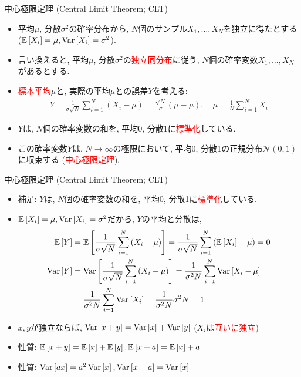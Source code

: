 \documentclass[dvipdfmx,notheorems,t]{beamer}
\begin{document}
\begin{frame}{中心極限定理 (Central Limit Theorem; CLT)}
\begin{itemize}
  \item 平均$\mu$, 分散$\sigma^2$の確率分布から, $N$個のサンプル$X_1, \ldots, X_N$を独立に得たとする
  ($\operatorname{\mathbb{E}} \left[ X_i \right] = \mu, \operatorname{Var} \left[ X_i \right] = \sigma^2$).
  \item 言い換えると, 平均$\mu$, 分散$\sigma^2$の\textcolor{red}{独立同分布}に従う,
  $N$個の確率変数$X_1, \ldots, X_N$があるとする.
  \item \textcolor{red}{標本平均}$\bar{\mu}$と, 実際の平均$\mu$との誤差$Y$を考える:
  \begin{align*}
    Y = \frac{1}{\sigma \sqrt{N}} \sum_{i = 1}^N \left( X_i - \mu \right)
      = \frac{\sqrt{N}}{\sigma} \left( \bar{\mu} - \mu \right), \quad
    \bar{\mu} = \frac{1}{N} \sum_{i = 1}^N X_i
  \end{align*}
  \item $Y$は, $N$個の確率変数の和を, 平均0, 分散1に\textcolor{red}{標準化}している.
  \item この確率変数$Y$は, $N \to \infty$の極限において, 平均0, 分散1の正規分布$\mathcal{N}(0, 1)$に収束する
  (\textcolor{red}{中心極限定理}).
\end{itemize}
\end{frame}

\begin{frame}{中心極限定理 (Central Limit Theorem; CLT)}
\begin{itemize}
  \item 補足: $Y$は, $N$個の確率変数の和を, 平均0, 分散1に\textcolor{red}{標準化}している.
  \item $\operatorname{\mathbb{E}} \left[ X_i \right] = \mu, \operatorname{Var} \left[ X_i \right] = \sigma^2$だから, $Y$の平均と分散は,
  \begin{align*}
    \operatorname{\mathbb{E}} \left[ Y \right] &= \operatorname{\mathbb{E}} \left[ \frac{1}{\sigma \sqrt{N}} \sum_{i = 1}^N \left( X_i - \mu \right) \right]
      = \frac{1}{\sigma \sqrt{N}} \sum_{i = 1}^N \left( \operatorname{\mathbb{E}} \left[ X_i \right] - \mu \right)
      = 0 \\
    \operatorname{Var} \left[ Y \right] &= \operatorname{Var} \left[ \frac{1}{\sigma \sqrt{N}} \sum_{i = 1}^N \left( X_i - \mu \right) \right]
      = \frac{1}{\sigma^2 N} \sum_{i = 1}^N \operatorname{Var} \left[ X_i - \mu \right] \\
      &= \frac{1}{\sigma^2 N} \sum_{i = 1}^N \operatorname{Var} \left[ X_i \right]
      = \frac{1}{\sigma^2 N} \sigma^2 N = 1
  \end{align*}
  \item $x, y$が独立ならば, $\operatorname{Var} \left[ x + y \right] = \operatorname{Var} \left[ x \right] + \operatorname{Var} \left[ y \right]$ ($X_i$は\textcolor{red}{互いに独立})
  \item 性質: $\operatorname{\mathbb{E}} \left[ x + y \right] = \operatorname{\mathbb{E}} \left[ x \right] + \operatorname{\mathbb{E}} \left[ y \right], \operatorname{\mathbb{E}} \left[ x + a \right] = \operatorname{\mathbb{E}} \left[ x \right] + a$
  \item 性質: $\operatorname{Var} \left[ ax \right] = a^2 \operatorname{Var} \left[ x \right], \operatorname{Var} \left[ x + a \right] = \operatorname{Var} \left[ x \right]$
\end{itemize}
\end{frame}
\end{document}

